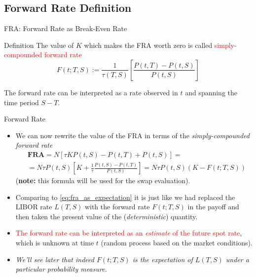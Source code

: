 \documentclass{beamer}
\begin{document}
\subsection{Forward Rate Definition}
\begin{frame}{FRA: Forward Rate as Break-Even Rate}
	\begin{block}{Definition}
		The value of $K$ which makes the FRA worth zero is called \textcolor{red}{simply-compounded forward rate}
		\begin{equation}
			F(t;T,S):=\frac{1}{\tau(T,S)}\left[\frac{P(t,T)-P(t,S)}{P(t,S)}\right]
			\label{eq:forward_rate_definition}
		\end{equation}
	\end{block}
	
	The forward rate can be interpreted as a rate observed in $t$ and spanning the time period $S-T$.
	
	
\end{frame}

\begin{frame}{Forward Rate}
	\begin{itemize}
		\item We can now rewrite the value of the FRA in terms of the \emph{simply-compounded forward rate}
		\begin{equation}
			\begin{aligned}
			&\textbf{FRA}=N[\tau KP(t,S)-P(t,T)+P(t,S)] = \\
			&=N\tau P(t,S) \left[K +\frac{1}{\tau} \frac{P(t,S)-P(t,T)}{P(t,S)}\right] = N\tau P(t,S)(K-F(t;T,S))
			\end{aligned}
			\label{eq:fram_payoff_withF}
		\end{equation}
		(\textbf{note:} this formula will be used for the swap evaluation).
		\item<2-> Comparing to \cref{eq:fra_as_expectation} it is just like we had replaced the LIBOR rate $L(T,S)$ with the forward rate $F(t;T,S)$ in the payoff and then taken the present value of the (\emph{deterministic}) quantity.
		\item<3-> \textcolor{red}{The forward rate can be interpreted as an \emph{estimate} of the future spot rate}, which is unknown at time $t$ (random process based on the market conditions).
		\item<4-> \emph{We'll see later that indeed $F(t;T,S)$ is the expectation of $L(T,S)$ under a particular probability measure.}
	\end{itemize}
\end{frame}
\end{document}
